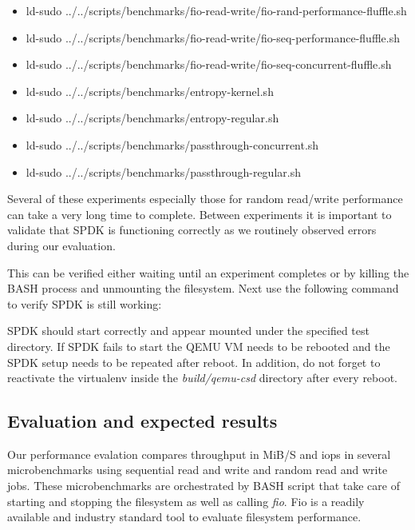 \begin{itemize}
    \item ld-sudo ../../scripts/benchmarks/fio-read-write/fio-rand-performance-fluffle.sh
    \item ld-sudo ../../scripts/benchmarks/fio-read-write/fio-seq-performance-fluffle.sh
    \item ld-sudo ../../scripts/benchmarks/fio-read-write/fio-seq-concurrent-fluffle.sh
    \item ld-sudo ../../scripts/benchmarks/entropy-kernel.sh
    \item ld-sudo ../../scripts/benchmarks/entropy-regular.sh
    \item ld-sudo ../../scripts/benchmarks/passthrough-concurrent.sh
    \item ld-sudo ../../scripts/benchmarks/passthrough-regular.sh
\end{itemize}

Several of these experiments especially those for random read/write performance
can take a very long time to complete. Between experiments it is important to
validate that SPDK is functioning correctly as we routinely observed errors
during our evaluation.

This can be verified either waiting until an experiment completes or by killing
the BASH process and unmounting the filesystem. Next use the following command
to verify SPDK is still working:


SPDK should start correctly and appear mounted under the specified test
directory. If SPDK fails to start the QEMU VM needs to be rebooted and the SPDK
setup needs to be repeated after reboot. In addition, do not forget to
reactivate the virtualenv inside the \textit{build/qemu-csd} directory after
every reboot.

\subsection{Evaluation and expected results}

Our performance evalation compares throughput in MiB/S and iops in several
microbenchmarks using sequential read and write and random read and write jobs.
These microbenchmarks are orchestrated by BASH script that take care of starting
and stopping the filesystem as well as calling \textit{fio}. Fio is a readily
available and industry standard tool to evaluate filesystem performance.

